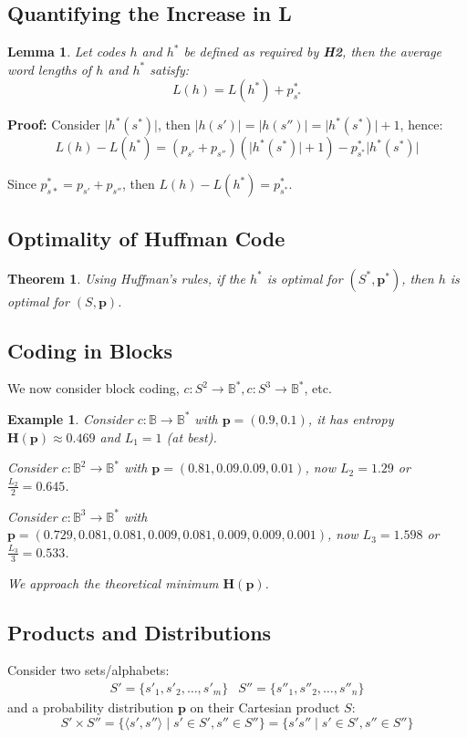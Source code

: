 \documentclass[11pt]{article}
\newtheorem{eg}{Example}
\newtheorem{theo}{Theorem}
\newtheorem{lem}{Lemma}
\begin{document}
\subsection{Quantifying the Increase in L}
\begin{lem}
  Let codes $h$ and $h^*$ be defined as required by \textbf{H2}, then the average word lengths of $h$ and $h^*$ satisfy:
  \[
    L(h) = L(h^*) + p_{s^*}^*
  \]
\end{lem}

\textbf{Proof:}
Consider $\lvert h^*(s^*) \rvert$, then $\lvert h(s') \rvert = \lvert h(s'') \rvert = \lvert h^*(s^*) \rvert + 1$, hence:
\[
  L(h) - L(h^*) = (p_{s'} + p_{s''})(\lvert h^*(s^*) \rvert + 1) - p_{s^*}^* \lvert h^*(s^*) \rvert
\]

Since $p_{s*}^* = p_{s'} + p_{s''}$, then $L(h) - L(h^*) = p_{s^*}^*$.

\subsection{Optimality of Huffman Code}
\begin{theo}
  Using Huffman's rules, if the $h^*$ is optimal for $(S^*, \textbf{p}^*)$, then $h$ is optimal for $(S, \textbf{p})$.
\end{theo}

\subsection{Coding in Blocks}
We now consider block coding, $c : S^2 \rightarrow \mathbb{B}^*, c : S^3 \rightarrow \mathbb{B}^*$, etc.
\begin{eg}
  Consider $c: \mathbb{B} \rightarrow \mathbb{B}^*$ with $\textbf{p} = (0.9, 0.1)$, it has entropy $\textbf{H}(\textbf{p}) \approx 0.469$ and $L_1 = 1$ (at best).

  Consider $c: \mathbb{B}^2 \rightarrow \mathbb{B}^*$ with $\textbf{p} = (0.81, 0.09. 0.09, 0.01)$, now $L_2 = 1.29$ or $\frac{L_2}{2} = 0.645$.

  Consider $c: \mathbb{B}^3 \rightarrow \mathbb{B}^*$ with $\textbf{p} = (0.729, 0.081, 0.081, 0.009, 0.081, 0.009, 0.009, 0.001)$, now $L_3 = 1.598$ or $\frac{L_3}{3} = 0.533$.

  We approach the theoretical minimum $\textbf{H}(\textbf{p})$.
\end{eg}

\subsection{Products and Distributions}
Consider two sets/alphabets:
\begin{align*}
  S' = \{ s'_1, s'_2, \ldots, s'_m \} & S'' = \{ s''_1, s''_2, \ldots, s''_n \}
\end{align*}
and a probability distribution $\textbf{p}$ on their Cartesian product $S$:
\[
  S' \times S'' = \{ \langle s', s'' \rangle \mid s' \in S', s'' \in S'' \} = \{ s's'' \mid s' \in S', s'' \in S'' \}
\]
\end{document}
